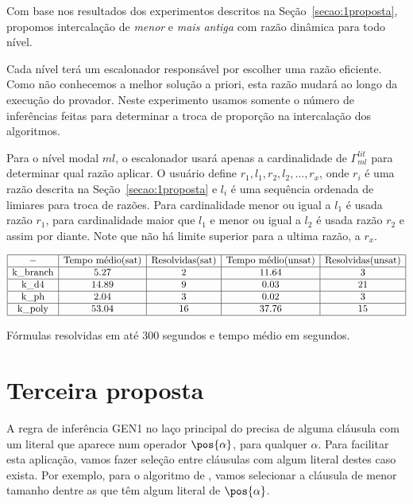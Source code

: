 Com base nos resultados dos experimentos descritos na Seção~\ref{secao:1proposta}, propomos intercalação de \textit{menor} e \textit{mais antiga} com razão dinâmica para todo nível.

Cada nível terá um escalonador responsável por escolher uma razão eficiente. Como não conhecemos a melhor solução a priori, esta razão mudará ao longo da execução do provador. Neste experimento usamos somente o número de inferências feitas para determinar a troca de proporção na intercalação dos algoritmos.

Para o nível modal $ml$, o escalonador usará apenas a cardinalidade de $\Gamma^{lit}_{ml}$ para determinar qual razão aplicar. O usuário define $r_1, l_1, r_2, l_2, \ldots, r_x$, onde $r_i$ é uma razão descrita na Seção~\ref{secao:1proposta} e $l_i$ é uma sequência ordenada de limiares para troca de razões. Para cardinalidade menor ou igual a $l_1$ é usada razão $r_1$, para cardinalidade maior que $l_1$ e menor ou igual a $l_2$ é usada razão $r_2$ e assim por diante. Note que não há limite superior para a ultima razão, a $r_x$.

\begin{table*}[t]
	\[
\begin{array}{|c|c|c|c|c|}
	\hline - & \textnormal{Tempo médio(sat)} & \textnormal{Resolvidas(sat)} & \textnormal{Tempo médio(unsat)} & \textnormal{Resolvidas(unsat)} \\
	
	\hline \textnormal{k\_branch} & 5.27 & 2 & 11.64 & 3 \\
	\hline \textnormal{k\_d4} & 14.89 & 9 & 0.03 & 21 \\
	\hline \textnormal{k\_ph} & 2.04 & 3 & 0.02 & 3 \\
	\hline \textnormal{k\_poly} & 53.04 & 16 & 37.76 & 15 \\
	
	\hline
	
\end{array}
	\]
\caption{Fórmulas resolvidas em até 300 segundos e tempo médio em segundos.}
\label{table:300threshold1}
\end{table*}

\section{Terceira proposta}
A regra de inferência GEN1 no laço principal do \ksp precisa de alguma cláusula com um literal que aparece num operador $\pos{\alpha}$, para qualquer $\alpha$. Para facilitar esta aplicação, vamos fazer seleção entre cláusulas com algum literal destes caso exista. Por exemplo, para o algoritmo de , vamos selecionar a cláusula de menor tamanho dentre as que têm algum literal de $\pos{\alpha}$.



